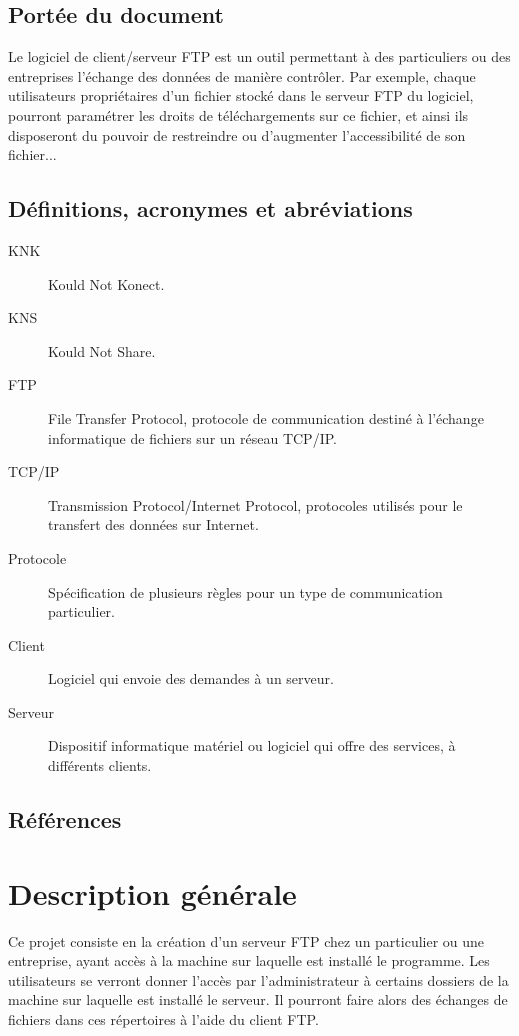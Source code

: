 \documentclass[10pt,a4paper]{report}
\begin{document}
\subsection{Portée du document}
Le logiciel de client/serveur FTP est un outil permettant à des particuliers ou des entreprises l'échange des données de manière contrôler. Par exemple, chaque utilisateurs propriétaires d'un fichier stocké dans le serveur FTP du logiciel, pourront paramétrer les droits de téléchargements sur ce fichier, et ainsi ils disposeront du pouvoir de restreindre ou d'augmenter l'accessibilité de son fichier...


\subsection{Définitions, acronymes et abréviations}
\begin{description}
\item[KNK] Kould Not Konect.
\item[KNS] Kould Not Share.
\item[FTP] File Transfer Protocol, protocole de communication destiné à l'échange informatique de fichiers sur un réseau TCP/IP.
\item[TCP/IP] Transmission Protocol/Internet Protocol, protocoles utilisés pour le transfert des données sur Internet.
\item[Protocole] Spécification de plusieurs règles pour un type de communication particulier.
\item[Client] Logiciel qui envoie des demandes à un serveur.
\item[Serveur] Dispositif informatique matériel ou logiciel qui offre des services, à différents clients.
\end{description}

\subsection{Références}


\section{Description générale}

Ce projet consiste en la création d'un serveur FTP chez un particulier ou une entreprise, ayant accès à la machine sur laquelle est installé le programme. Les utilisateurs se verront donner l'accès par l'administrateur à certains dossiers de la machine sur laquelle est installé le serveur. Il pourront faire alors des échanges de fichiers dans ces répertoires à l'aide du client FTP.
\end{document}
